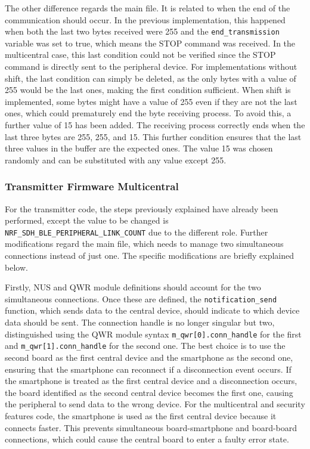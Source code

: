 \documentclass{Configuration_Files/PoliMi3i_thesis}
\begin{document}
The other difference regards the main file. It is related to when the end of the communication should occur. In the previous implementation, this happened when both the last two bytes received were 255 and the \texttt{end\_transmission} variable was set to true, which means the STOP command was received. In the multicentral case, this last condition could not be verified since the STOP command is directly sent to the peripheral device. For implementations without shift, the last condition can simply be deleted, as the only bytes with a value of 255 would be the last ones, making the first condition sufficient. When shift is implemented, some bytes might have a value of 255 even if they are not the last ones, which could prematurely end the byte receiving process. To avoid this, a further value of 15 has been added. The receiving process correctly ends when the last three bytes are 255, 255, and 15. This further condition ensures that the last three values in the buffer are the expected ones. The value 15 was chosen randomly and can be substituted with any value except 255.

\subsubsection{Transmitter Firmware Multicentral}
For the transmitter code, the steps previously explained have already been performed, except the value to be changed is \texttt{NRF\_SDH\_BLE\_PERIPHERAL\_LINK\_COUNT} due to the different role. Further modifications regard the main file, which needs to manage two simultaneous connections instead of just one. The specific modifications are briefly explained below.

Firstly, NUS and QWR module definitions should account for the two simultaneous connections. Once these are defined, the \texttt{notification\_send} function, which sends data to the central device, should indicate to which device data should be sent. The connection handle is no longer singular but two, distinguished using the QWR module syntax \texttt{m\_qwr[0].conn\_handle} for the first and \texttt{m\_qwr[1].conn\_handle} for the second one. The best choice is to use the second board as the first central device and the smartphone as the second one, ensuring that the smartphone can reconnect if a disconnection event occurs. If the smartphone is treated as the first central device and a disconnection occurs, the board identified as the second central device becomes the first one, causing the peripheral to send data to the wrong device. For the multicentral and security features code, the smartphone is used as the first central device because it connects faster. This prevents simultaneous board-smartphone and board-board connections, which could cause the central board to enter a faulty error state.
\end{document}
